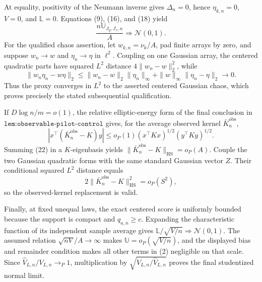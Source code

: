 At equality, positivity of the Neumann inverse gives \(\Delta_n=0\), hence \(\eta_{k,n}=0\), \(V=0\), and \(\mathbb L=0\). Equations (9), (16), and (18) yield
\[
\frac{n\mathbb U_{J_y,J_z,n}}A\Rightarrow\mathcal N(0,1). \tag{20}
\]
For the qualified chaos assertion, let \(w_{k,n}=\nu_k/A\), pad finite arrays by zero, and suppose \(w_n\to w\) and \(\eta_n\to\eta\) in \(\ell^2\). Coupling on one Gaussian array, the centered quadratic parts have squared \(L^2\) distance \(4\|w_n-w\|_2^2\), while
\[
\|w_n\eta_n-w\eta\|_2
\le\|w_n-w\|_2\|\eta_n\|_\infty+
\|w\|_\infty\|\eta_n-\eta\|_2\to0.                  \tag{21}
\]
Thus the proxy converges in \(L^2\) to the asserted centered Gaussian chaos, which proves precisely the stated subsequential qualification.

If \(D\log n/m=o(1)\), the relative elliptic-energy form of the final conclusion in \(\texttt{lem:observable-pilot-control}\) gives, for the average observed kernel \(\bar K_n^{\mathrm{obs}}\),
\[
|x^\top(\bar K_n^{\mathrm{obs}}-K)y|
\le o_P(1)(x^\top Kx)^{1/2}(y^\top Ky)^{1/2}.         \tag{22}
\]
Summing (22) in a \(K\)-eigenbasis yields
\(\|\bar K_n^{\mathrm{obs}}-K\|_{\mathrm{HS}}=o_P(A)\).
Couple the two Gaussian quadratic forms with the same standard Gaussian vector \(Z\). Their conditional squared \(L^2\) distance equals
\[
2\|\bar K_n^{\mathrm{obs}}-K\|_{\mathrm{HS}}^2=o_P(S^2), \tag{23}
\]
so the observed-kernel replacement is valid.

Finally, at fixed unequal laws, the exact centered score is uniformly bounded because the support is compact and \(q_{a,n}\ge c\). Expanding the characteristic function of its independent sample average gives \(\mathbb L/\sqrt{V/n}\Rightarrow\mathcal N(0,1)\). The assumed relation \(\sqrt{nV}/A\to\infty\) makes \(\mathbb U=o_P(\sqrt{V/n})\), and the displayed bias and remainder condition makes all other terms in (2) negligible on that scale. Since \(\widehat V_{L,n}/V_{L,n}\to_P1\), multiplication by \(\sqrt{V_{L,n}/\widehat V_{L,n}}\) proves the final studentized normal limit.